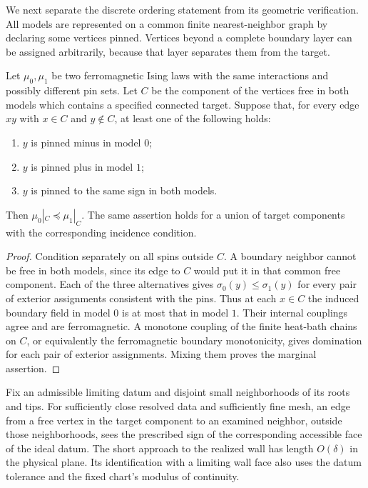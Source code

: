 We next separate the discrete ordering statement from its geometric
verification.  All models are represented on a common finite
nearest-neighbor graph by declaring some vertices pinned.  Vertices
beyond a complete boundary layer can be assigned arbitrarily, because
that layer separates them from the target.

\begin{lemma}\label{if:incidence-order}
Let $\mu_0,\mu_1$ be two ferromagnetic Ising laws with the same
interactions and possibly different pin sets.  Let $C$ be the component
of the vertices free in both models which contains a specified connected
target.  Suppose that, for every edge $xy$ with $x\in C$ and $y\notin C$,
at least one of the following holds:
\begin{enumerate}
\item $y$ is pinned minus in model $0$;
\item $y$ is pinned plus in model $1$;
\item $y$ is pinned to the same sign in both models.
\end{enumerate}
Then $\mu_0|_C\preceq\mu_1|_C$.  The same assertion holds for a union
of target components with the corresponding incidence condition.
\end{lemma}

\begin{proof}
Condition separately on all spins outside $C$.  A boundary neighbor
cannot be free in both models, since its edge to $C$ would put it in
that common free component.  Each of the three alternatives gives
$\sigma_0(y)\le\sigma_1(y)$ for every pair of exterior assignments
consistent with the pins.  Thus at each $x\in C$ the induced boundary
field in model $0$ is at most that in model $1$.  Their internal
couplings agree and are ferromagnetic.  A monotone coupling of the
finite heat-bath chains on $C$, or equivalently the ferromagnetic
boundary monotonicity, gives domination for each pair of exterior
assignments.  Mixing them proves the marginal assertion.
\end{proof}

\begin{lemma}
\label{if:triangle-incidence}
Fix an admissible limiting datum and disjoint small neighborhoods of
its roots and tips.  For sufficiently close resolved data and sufficiently
fine mesh, an edge from a free vertex in the target component to an
examined neighbor, outside those neighborhoods, sees the prescribed
sign of the corresponding accessible face of the ideal datum.
The short approach to the realized wall has length $O(\delta)$ in
the physical plane.  Its identification with a limiting wall face
also uses the datum tolerance and the fixed chart's modulus of
continuity.
\end{lemma}

